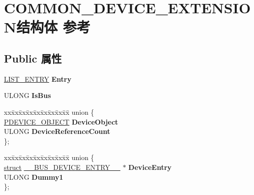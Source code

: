 \hypertarget{struct_c_o_m_m_o_n___d_e_v_i_c_e___e_x_t_e_n_s_i_o_n}{}\section{C\+O\+M\+M\+O\+N\+\_\+\+D\+E\+V\+I\+C\+E\+\_\+\+E\+X\+T\+E\+N\+S\+I\+O\+N结构体 参考}
\label{struct_c_o_m_m_o_n___d_e_v_i_c_e___e_x_t_e_n_s_i_o_n}
\subsection*{Public 属性}
\begin{DoxyCompactItemize}
\item 
\mbox{\label{struct_c_o_m_m_o_n___d_e_v_i_c_e___e_x_t_e_n_s_i_o_n_a80cd6bcd25d2d04339c9f21f7c6220eb}} 
\hyperlink{struct___l_i_s_t___e_n_t_r_y}{L\+I\+S\+T\+\_\+\+E\+N\+T\+RY} {\bfseries Entry}
\item 
\mbox{\label{struct_c_o_m_m_o_n___d_e_v_i_c_e___e_x_t_e_n_s_i_o_n_a5de9a66a76b4a3f3ad976ae11f9f23ad}} 
U\+L\+O\+NG {\bfseries Is\+Bus}
\item 
\mbox{\label{struct_c_o_m_m_o_n___d_e_v_i_c_e___e_x_t_e_n_s_i_o_n_a8fe0fe57c0b4fbbd664582d6f99dbcf8}} 
\begin{tabbing}
xx\=xx\=xx\=xx\=xx\=xx\=xx\=xx\=xx\=\kill
union \{\\
\>\hyperlink{struct___d_e_v_i_c_e___o_b_j_e_c_t}{PDEVICE\_OBJECT} {\bfseries DeviceObject}\\
\>ULONG {\bfseries DeviceReferenceCount}\\
\}; \\

\end{tabbing}\item 
\mbox{\label{struct_c_o_m_m_o_n___d_e_v_i_c_e___e_x_t_e_n_s_i_o_n_ae3083e33297f4d56b73d0d0e6b3438ce}} 
\begin{tabbing}
xx\=xx\=xx\=xx\=xx\=xx\=xx\=xx\=xx\=\kill
union \{\\
\>\hyperlink{interfacestruct}{struct} \hyperlink{struct_____b_u_s___d_e_v_i_c_e___e_n_t_r_y____}{\_\_BUS\_DEVICE\_ENTRY\_\_} $\ast$ {\bfseries DeviceEntry}\\
\>ULONG {\bfseries Dummy1}\\
\}; \\


\end{tabbing}
\end{DoxyCompactItemize}
